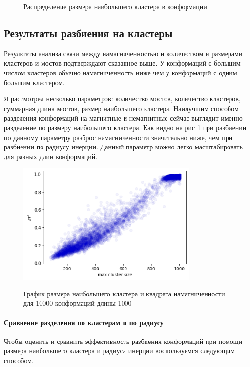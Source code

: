 \begin{figure}[H]
\begin{subfigure}[t]{0.3\textwidth}
	\end{subfigure}
	\caption{Распределение размера наибольшего кластера в конформации.}
\end{figure}


\subsection{Результаты разбиения на кластеры}
Результаты анализа связи между намагниченностью и количеством и размерами кластеров и мостов подтверждают сказанное выше. У конформаций с большим числом кластеров обычно намагниченность ниже чем у конформаций с одним большим кластером. 

Я рассмотрел несколько параметров: количество мостов, количество кластеров, суммарная длина мостов, размер наибольшего кластера. Наилучшим способом разделения конформаций на магнитные и немагнитные сейчас выглядит именно разделение по размеру наибольшего кластера. Как видно на рис \ref{fig:mag_from_max_cluster} при разбиении по данному параметру разброс намагниченности значительно ниже, чем при разбиении по радиусу инерции. Данный параметр можно легко масштабировать для разных длин конформаций.

\begin{figure}[h]
	\centering
	\caption{График размера наибольшего кластера и квадрата намагниченности для 10000 конформаций длины 1000}
	\includegraphics[width=0.8\textwidth]{../images/mag_from_cluster_size.png} 
	\label{fig:mag_from_max_cluster}
\end{figure}

\paragraph{Сравнение разделения по кластерам и по радиусу}
Чтобы оценить и сравнить эффективность разбиения конформаций при помощи размера наибольшего кластера и радиуса инерции воспользуемся следующим способом.

